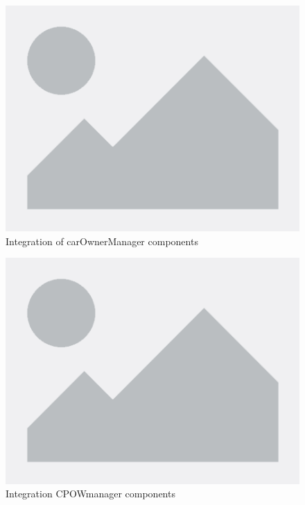 \documentclass[table, 12pt]{article}
\begin{document}
\begin{figure}[H]
    \centering
    \includegraphics[scale=0.6, center]{assets/placeholder.png}
    \caption{Integration of carOwnerManager components}
    \label{fig: integration_PolicyMakerManager}
\end{figure}
\begin{figure}[H]
    \centering
    \includegraphics[scale=0.6, center]{assets/placeholder.png}
    \caption{Integration CPOWmanager components}
    \label{fig: integration_AgronomistManager}
\end{figure}
\end{document}
